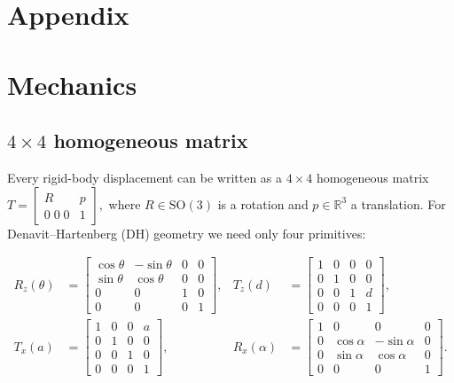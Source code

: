 \documentclass[12pt,a4paper]{article}
\begin{document}
\vfill




 


\appendix             

\section*{Appendix}
\section{Mechanics}
\subsection{$4\times4$ homogeneous matrix}\label{app:ht}
Every rigid-body displacement can be written as a $4\times4$ homogeneous matrix
\(
T =
\begin{bmatrix} R & p \\ 0\;0\;0 & 1 \end{bmatrix},
\)
where $R\in\mathrm{SO}(3)$ is a rotation and $p\in\mathbb R^{3}$ a translation.
For Denavit–Hartenberg (DH) geometry we need only four primitives:

\begin{align}
R_{z}(\theta) &=
\begin{bmatrix}
\cos\theta & -\sin\theta & 0 & 0\\
\sin\theta &  \cos\theta & 0 & 0\\
0          &  0          & 1 & 0\\
0&0&0&1
\end{bmatrix}, &
T_{z}(d) &=
\begin{bmatrix}
1&0&0&0\\
0&1&0&0\\
0&0&1&d\\
0&0&0&1
\end{bmatrix}, \\
T_{x}(a) &=
\begin{bmatrix}
1&0&0&a\\
0&1&0&0\\
0&0&1&0\\
0&0&0&1
\end{bmatrix}, &
R_{x}(\alpha) &=
\begin{bmatrix}
1 & 0 & 0 & 0\\
0 & \cos\alpha & -\sin\alpha & 0\\
0 & \sin\alpha &  \cos\alpha & 0\\
0&0&0&1
\end{bmatrix}.
\end{align}
\end{document}
